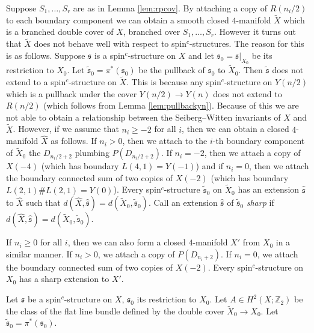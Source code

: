 \documentclass{amsart}
\theoremstyle{definition}
\theoremstyle{remark}
\numberwithin{equation}{section}
\begin{document}
Suppose $S_1, \dots , S_r$ are as in Lemma \ref{lem:rpcov}. By attaching a copy of $R(n_i/2)$ to each boundary component we can obtain a smooth closed $4$-manifold $\widetilde{X}$ which is a branched double cover of $X$, branched over $S_1, \dots, S_r$. However it turns out that $\widetilde{X}$ does not behave well with respect to spin$^c$-structures. The reason for this is as follows. Suppose $\mathfrak{s}$ is a spin$^c$-structure on $X$ and let $\mathfrak{s}_0 = \mathfrak{s}|_{X_0}$ be its restriction to $X_0$. Let $\widetilde{\mathfrak{s}}_0 = \pi^*(\mathfrak{s}_0)$ be the pullback of $\mathfrak{s}_0$ to $\widetilde{X}_0$. Then $\widetilde{\mathfrak{s}}$ does not extend to a spin$^c$-structure on $\widetilde{X}$. This is because any spin$^c$-structure on $Y(n/2)$ which is a pullback under the cover $Y(n/2) \to Y(n)$ does not extend to $R(n/2)$ (which follows from Lemma \ref{lem:pullbackyn}). Because of this we are not able to obtain a relationship between the Seiberg--Witten invariants of $X$ and $\widetilde{X}$. However, if we assume that $n_i \ge -2$ for all $i$, then we can obtain a closed $4$-manifold $\widehat{X}$ as follows. If $n_i > 0$, then we attach to the $i$-th boundary component of $\widetilde{X}_0$ the $D_{n_i/2+2}$ plumbing $P(D_{n_i/2+2})$. If $n_i = -2$, then we attach a copy of $X(-4)$ (which has boundary $L(4,1) = Y(-1)$) and if $n_i = 0$, then we attach the boundary connected sum of two copies of $X(-2)$ (which has boundary $L(2,1) \# L(2,1) = Y(0)$). Every spin$^c$-structure $\widetilde{\mathfrak{s}}_0$ on $\widetilde{X}_0$ has an extension $\widehat{\mathfrak{s}}$ to $\widehat{X}$ such that $d(\widehat{X} , \widehat{\mathfrak{s}}) = d(\widetilde{X}_0 , \widetilde{\mathfrak{s}}_0)$. Call an extension $\widehat{\mathfrak{s}}$ of $\widetilde{\mathfrak{s}}_0$ {\em sharp} if $d(\widehat{X} , \widehat{\mathfrak{s}}) = d(\widetilde{X}_0 , \widetilde{\mathfrak{s}}_0)$.

If $n_i \ge 0$ for all $i$, then we can also form a closed $4$-manifold $X'$ from $X_0$ in a similar manner. If $n_i > 0$, we attach a copy of $P(D_{n_i+2})$. If $n_i = 0$, we attach the boundary connected sum of two copies of $X(-2)$. Every spin$^c$-structure on $X_0$ has a sharp extension to $X'$.

Let $\mathfrak{s}$ be a spin$^c$-structure on $X$, $\mathfrak{s}_0$ its restriction to $X_0$. Let $A \in H^2(X ; \mathbb{Z}_2)$ be the class of the flat line bundle defined by the double cover $\widetilde{X}_0 \to X_0$. Let $\widetilde{\mathfrak{s}}_0 = \pi^*(\mathfrak{s}_0)$.
\end{document}
